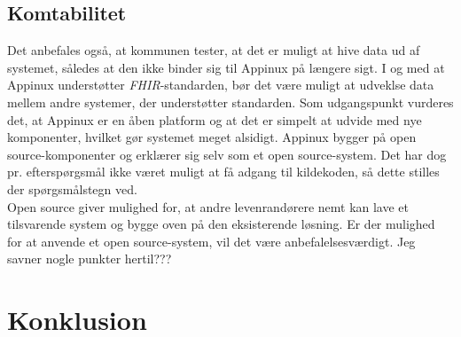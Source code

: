 \subsection{Komtabilitet}
Det anbefales også, at kommunen tester, at det er muligt at hive data ud af systemet, således at den ikke binder sig til Appinux på længere sigt. I og med at Appinux understøtter \textit{FHIR}-standarden, bør det være muligt at udveklse data mellem andre systemer, der understøtter standarden. Som udgangspunkt vurderes det, at Appinux er en åben platform og at det er simpelt at udvide med nye komponenter, hvilket gør systemet meget alsidigt. Appinux bygger på open source-komponenter og erklærer sig selv som et open source-system. Det har dog pr. efterspørgsmål ikke været muligt at få adgang til kildekoden, så dette stilles der spørgsmålstegn ved.\\Open source giver mulighed for, at andre levenrandørere nemt kan lave et tilsvarende system og bygge oven på den eksisterende løsning. Er der mulighed for at anvende et open source-system, vil det være anbefalelsesværdigt.
Jeg savner nogle punkter hertil???
\section{Konklusion}

